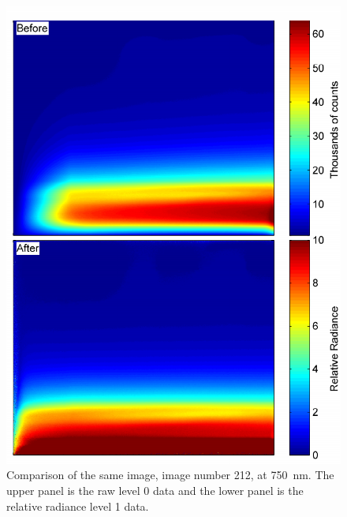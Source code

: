 \begin{figure}
\includegraphics[width=1.0\textwidth]{./Images/5-2-BeforeAfterImage.pdf}
    \caption[Comparison of an Raw and Calibrated ALI Image]{Comparison of the same image, image number 212, at 750~nm. The upper panel is the raw level 0 data and the lower panel is the relative radiance level 1 data.}
    \label{fig:5.2:BeforeAfterImages}
\end{figure}

